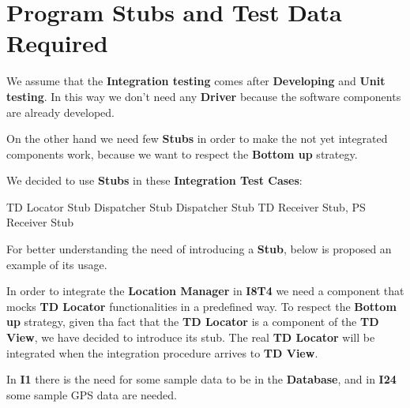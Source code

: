 \section{Program Stubs and Test Data Required}
We assume that the \textbf{Integration testing} comes after \textbf{Developing} and \textbf{Unit testing}. In this way we don't need any \textbf{Driver} because the software components are already developed.\par
On the other hand we need few \textbf{Stubs} in order to make the not yet integrated components work, because we want to respect the \textbf{Bottom up} strategy.\par
We decided to use \textbf{Stubs} in these \textbf{Integration Test Cases}:
\begin{itemize}
	 TD Locator Stub
	 Dispatcher Stub
	 Dispatcher Stub
	 TD Receiver Stub, PS Receiver Stub 
\end{itemize}

For better understanding the need of introducing a \textbf{Stub}, below is proposed an example of its usage.\par
In order to integrate the \textbf{Location Manager} in \textbf{I8T4} we need a component that mocks \textbf{TD Locator} functionalities in a predefined way. 
To respect the \textbf{Bottom up} strategy, given tha fact that the \textbf{TD Locator} is a component of the \textbf{TD View}, we have decided to introduce its stub.
The real \textbf{TD Locator} will be integrated when the integration procedure arrives to \textbf{TD View}.\par
In \textbf{I1} there is the need for some sample data to be in the \textbf{Database}, and in \textbf{I24} some sample GPS data are needed.
